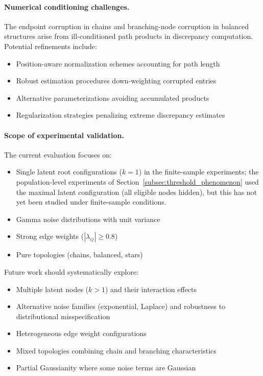 \documentclass[11pt,a4paper]{article}
\numberwithin{equation}{section}
\begin{document}
\paragraph{Numerical conditioning challenges.} The endpoint corruption in chains and branching-node corruption in balanced structures arise from ill-conditioned path products in discrepancy computation. Potential refinements include:
\begin{itemize}
\item Position-aware normalization schemes accounting for path length
\item Robust estimation procedures down-weighting corrupted entries
\item Alternative parameterizations avoiding accumulated products
\item Regularization strategies penalizing extreme discrepancy estimates
\end{itemize}

\paragraph{Scope of experimental validation.} The current evaluation focuses on:
\begin{itemize}
\item Single latent root configurations ($k=1$) in the finite-sample
experiments; the population-level experiments of Section~\ref{subsec:threshold_phenomenon}
used the maximal latent configuration (all eligible nodes hidden), but this
has not yet been studied under finite-sample conditions.
\item Gamma noise distributions with unit variance
\item Strong edge weights ($|\lambda_{ij}| \geq 0.8$)
\item Pure topologies (chains, balanced, stars)
\end{itemize}

Future work should systematically explore:
\begin{itemize}
\item Multiple latent nodes ($k > 1$) and their interaction effects
\item Alternative noise families (exponential, Laplace) and robustness to distributional misspecification
\item Heterogeneous edge weight configurations
\item Mixed topologies combining chain and branching characteristics
\item Partial Gaussianity where some noise terms are Gaussian
\end{itemize}
\end{document}
